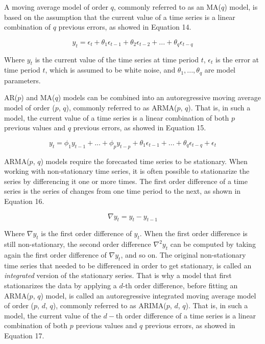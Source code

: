 \documentclass[12pt,oneside]{reedthesis}
\begin{document}
A moving average model of order \(q\), commonly referred to as an
MA(\(q\)) model, is based on the assumption that the current value of a
time series is a linear combination of \(q\) previous errors, as showed
in Equation 14.

\[ y_{t} = \epsilon_{t} + \theta_{1}\epsilon_{t-1} + \theta_{2}\epsilon_{t-2} + ... + \theta_{q}\epsilon_{t-q} \]

Where \(y_{t}\) is the current value of the time series at time period
\(t\), \(\epsilon_{t}\) is the error at time period \(t\), which is
assumed to be white noise, and \(\theta_{1},...,\theta_{q}\) are model
parameters.

AR(\(p\)) and MA(\(q\)) models can be combined into an autoregressive
moving average model of order (\(p\), \(q\)), commonly referred to as
ARMA(\(p\), \(q\)). That is, in such a model, the current value of a
time series is a linear combination of both \(p\) previous values and
\(q\) previous errors, as showed in Equation 15.

\[ 
y_{t} = \phi_{1}y_{t-1} + ... + \phi_{p}y_{t-p} + \theta_{1}\epsilon_{t-1} + ... + \theta_{q}\epsilon_{t-q} + \epsilon_{t} 
\]

ARMA(\(p\), \(q\)) models require the forecasted time series to be
stationary. When working with non-stationary time series, it is often
possible to stationarize the series by differencing it one or more
times. The first order difference of a time series is the series of
changes from one time period to the next, as shown in Equation 16.

\[ \nabla y_{t} = y_{t} - y_{t-1} \]

Where \(\nabla y_{t}\) is the first order difference of \(y_{t}\). When
the first order difference is still non-stationary, the second order
difference \(\nabla^{2}y_{t}\) can be computed by taking again the first
order difference of \(\nabla y_{t}\), and so on. The original
non-stationary time series that needed to be differenced in order to get
stationary, is called an \emph{integrated} version of the stationary
series. That is why a model that first stationarizes the data by
applying a \(d\)-th order difference, before fitting an ARMA(\(p\),
\(q\)) model, is called an autoregressive integrated moving average
model of order (\(p\), \(d\), \(q\)), commonly referred to as
ARIMA(\(p\), \(d\), \(q\)). That is, in such a model, the current value
of the \(d-\)th order difference of a time series is a linear
combination of both \(p\) previous values and \(q\) previous errors, as
showed in Equation 17.
\end{document}
